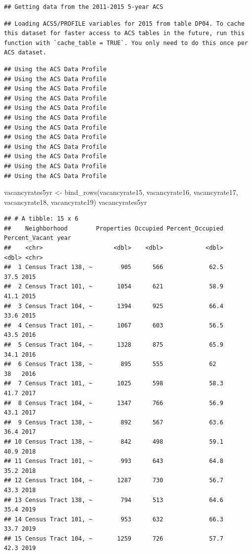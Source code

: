 \documentclass[
]{article}
\newenvironment{Shaded}{\begin{snugshade}}{\end{snugshade}}
\newcommand{\FunctionTok}[1]{\textcolor[rgb]{0.00,0.00,0.00}{#1}}
\newcommand{\NormalTok}[1]{#1}
\newcommand{\OtherTok}[1]{\textcolor[rgb]{0.56,0.35,0.01}{#1}}
\begin{document}
\begin{verbatim}
## Getting data from the 2011-2015 5-year ACS
\end{verbatim}

\begin{verbatim}
## Loading ACS5/PROFILE variables for 2015 from table DP04. To cache this dataset for faster access to ACS tables in the future, run this function with `cache_table = TRUE`. You only need to do this once per ACS dataset.
\end{verbatim}

\begin{verbatim}
## Using the ACS Data Profile
## Using the ACS Data Profile
## Using the ACS Data Profile
## Using the ACS Data Profile
## Using the ACS Data Profile
## Using the ACS Data Profile
## Using the ACS Data Profile
## Using the ACS Data Profile
## Using the ACS Data Profile
## Using the ACS Data Profile
## Using the ACS Data Profile
## Using the ACS Data Profile
\end{verbatim}

\begin{Shaded}
\begin{Highlighting}[]
\NormalTok{vacancyrates5yr }\OtherTok{\textless{}{-}} \FunctionTok{bind\_rows}\NormalTok{(vacancyrate15, vacancyrate16, vacancyrate17, vacancyrate18, vacancyrate19)}
\NormalTok{vacancyrates5yr}
\end{Highlighting}
\end{Shaded}

\begin{verbatim}
## # A tibble: 15 x 6
##    Neighborhood        Properties Occupied Percent_Occupied Percent_Vacant year 
##    <chr>                    <dbl>    <dbl>            <dbl>          <dbl> <chr>
##  1 Census Tract 138, ~        905      566             62.5           37.5 2015 
##  2 Census Tract 101, ~       1054      621             58.9           41.1 2015 
##  3 Census Tract 104, ~       1394      925             66.4           33.6 2015 
##  4 Census Tract 101, ~       1067      603             56.5           43.5 2016 
##  5 Census Tract 104, ~       1328      875             65.9           34.1 2016 
##  6 Census Tract 138, ~        895      555             62             38   2016 
##  7 Census Tract 101, ~       1025      598             58.3           41.7 2017 
##  8 Census Tract 104, ~       1347      766             56.9           43.1 2017 
##  9 Census Tract 138, ~        892      567             63.6           36.4 2017 
## 10 Census Tract 138, ~        842      498             59.1           40.9 2018 
## 11 Census Tract 101, ~        993      643             64.8           35.2 2018 
## 12 Census Tract 104, ~       1287      730             56.7           43.3 2018 
## 13 Census Tract 138, ~        794      513             64.6           35.4 2019 
## 14 Census Tract 101, ~        953      632             66.3           33.7 2019 
## 15 Census Tract 104, ~       1259      726             57.7           42.3 2019
\end{verbatim}
\end{document}
